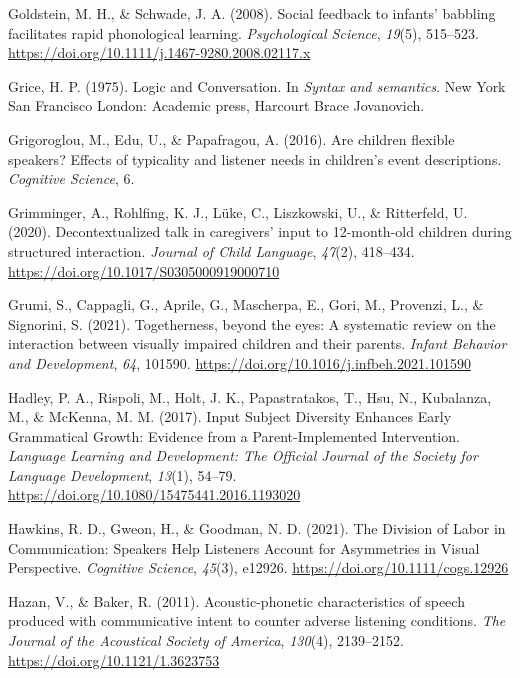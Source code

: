 \documentclass[
  man]{apa6}
\newlength{\cslhangindent}
\newlength{\cslentryspacingunit} %
\newenvironment{CSLReferences}[2] %
 {%
  \setlength{\parindent}{0pt}
  \ifodd #1
  \let\oldpar\par
  \def\par{\hangindent=\cslhangindent\oldpar}
  \fi
  \setlength{\parskip}{#2\cslentryspacingunit}
 }%
 {}
\begin{document}
\begin{CSLReferences}{1}{0}
\leavevmode{}%
Goldstein, M. H., \& Schwade, J. A. (2008). Social feedback to infants' babbling facilitates rapid phonological learning. \emph{Psychological Science}, \emph{19}(5), 515--523. \url{https://doi.org/10.1111/j.1467-9280.2008.02117.x}

\leavevmode{}%
Grice, H. P. (1975). {Logic and Conversation}. In \emph{{Syntax and semantics}}. New York San Francisco London: Academic press, Harcourt Brace Jovanovich.

\leavevmode{}%
Grigoroglou, M., Edu, U., \& Papafragou, A. (2016). Are children flexible speakers? {Effects} of typicality and listener needs in children's event descriptions. \emph{Cognitive Science}, 6.

\leavevmode{}%
Grimminger, A., Rohlfing, K. J., Lüke, C., Liszkowski, U., \& Ritterfeld, U. (2020). Decontextualized talk in caregivers' input to 12-month-old children during structured interaction. \emph{Journal of Child Language}, \emph{47}(2), 418--434. \url{https://doi.org/10.1017/S0305000919000710}

\leavevmode{}%
Grumi, S., Cappagli, G., Aprile, G., Mascherpa, E., Gori, M., Provenzi, L., \& Signorini, S. (2021). Togetherness, beyond the eyes: {A} systematic review on the interaction between visually impaired children and their parents. \emph{Infant Behavior and Development}, \emph{64}, 101590. \url{https://doi.org/10.1016/j.infbeh.2021.101590}

\leavevmode{}%
Hadley, P. A., Rispoli, M., Holt, J. K., Papastratakos, T., Hsu, N., Kubalanza, M., \& McKenna, M. M. (2017). Input {Subject Diversity Enhances Early Grammatical Growth}: {Evidence} from a {Parent-Implemented Intervention}. \emph{Language Learning and Development: The Official Journal of the Society for Language Development}, \emph{13}(1), 54--79. \url{https://doi.org/10.1080/15475441.2016.1193020}

\leavevmode{}%
Hawkins, R. D., Gweon, H., \& Goodman, N. D. (2021). The {Division} of {Labor} in {Communication}: {Speakers Help Listeners Account} for {Asymmetries} in {Visual Perspective}. \emph{Cognitive Science}, \emph{45}(3), e12926. \url{https://doi.org/10.1111/cogs.12926}

\leavevmode{}%
Hazan, V., \& Baker, R. (2011). Acoustic-phonetic characteristics of speech produced with communicative intent to counter adverse listening conditions. \emph{The Journal of the Acoustical Society of America}, \emph{130}(4), 2139--2152. \url{https://doi.org/10.1121/1.3623753}


\end{CSLReferences}
\end{document}
